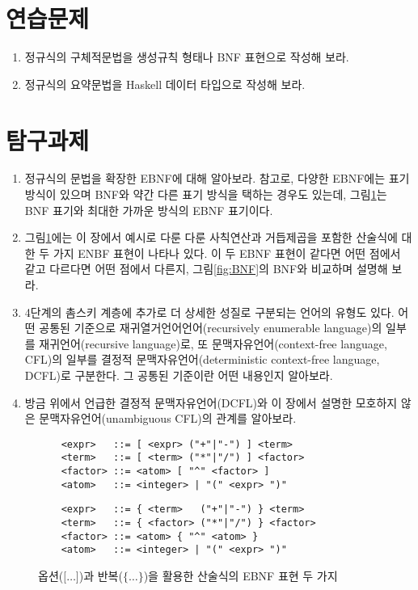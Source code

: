 \section*{연습문제}
\begin{enumerate}
 \item 정규식의 구체적문법을 생성규칙 형태나 BNF 표현으로 작성해 보라.
 \item 정규식의 요약문법을 Haskell 데이터 타입으로 작성해 보라.
\end{enumerate}

\section*{탐구과제}
\begin{enumerate}
 \item 정규식의 문법을 확장한 EBNF에 대해 알아보라.
       참고로, 다양한 EBNF에는 표기 방식이 있으며 BNF와 약간 다른
       표기 방식을 택하는 경우도 있는데, 그림\;\ref{fig:EBNF}는
       BNF 표기와 최대한 가까운 방식의 EBNF 표기이다.
 \item 그림\;\ref{fig:EBNF}에는 이 장에서 예시로 다룬 다룬 사칙연산과
       거듭제곱을 포함한 산술식에 대한 두 가지 ENBF 표현이 나타나 있다.
       이 두 EBNF 표현이 같다면 어떤 점에서 같고 다르다면 어떤 점에서
       다른지, 그림\;\ref{fig:BNF}의 BNF와 비교하며 설명해 보라.
 \item 4단계의 촘스키 계층에 추가로 더 상세한 성질로 구분되는 언어의
      유형도 있다. 어떤 공통된 기준으로 재귀열거언어언어(recursively
      enumerable language)의 일부를 재귀언어(recursive language)로,
      또 문맥자유언어(context-free language, CFL)의 일부를 결정적
      문맥자유언어(deterministic context-free language, DCFL)로 구분한다.
      그 공통된 기준이란 어떤 내용인지 알아보라.
 \item 방금 위에서 언급한 결정적 문맥자유언어(DCFL)와 이 장에서 설명한
       모호하지 않은 문맥자유언어(unambiguous CFL)의 관계를 알아보라.
\end{enumerate}


\begin{figure}[b]
\begin{lstlisting}
    <expr>   ::= [ <expr> ("+"|"-") ] <term>
    <term>   ::= [ <term> ("*"|"/") ] <factor>
    <factor> ::= <atom> [ "^" <factor> ]
    <atom>   ::= <integer> | "(" <expr> ")"
\end{lstlisting}

\begin{lstlisting}
    <expr>   ::= { <term>   ("+"|"-") } <term>
    <term>   ::= { <factor> ("*"|"/") } <factor>
    <factor> ::= <atom> { "^" <atom> }
    <atom>   ::= <integer> | "(" <expr> ")"
\end{lstlisting}
\caption{옵션($\texttt{[}\ldots\texttt{]}$)과
         반복($\texttt{\{}\ldots\texttt{\}}$)을
         활용한 산술식의 EBNF 표현 두 가지
         \label{fig:EBNF}}
\end{figure}



